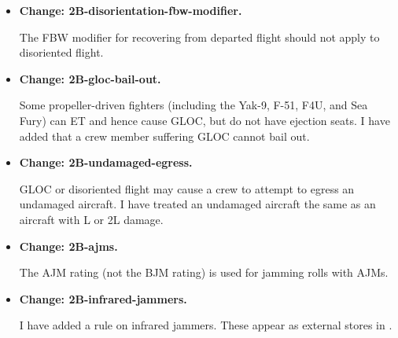\documentclass[10pt]{report}
\newcommand{\itemtag}[1]{\item \textbf{Change: #1.}\par}
\begin{document}
\begin{itemize}
    \itemtag{2B-disorientation-fbw-modifier} The FBW modifier for recovering from departed flight should not apply to disoriented flight.

    \itemtag{2B-gloc-bail-out} Some propeller-driven fighters (including the Yak-9, F-51, F4U, and Sea Fury) can ET and hence cause GLOC, but do not have ejection seats. I have added that a crew member suffering GLOC cannot bail out.

    \itemtag{2B-undamaged-egress} GLOC or disoriented flight may cause a crew to attempt to egress an undamaged aircraft. I have treated an undamaged aircraft the same as an aircraft with L or 2L damage.
    
    \itemtag{2B-ajms} The AJM rating (not the BJM rating) is used for jamming rolls with AJMs.
    
    \itemtag{2B-infrared-jammers} I have added a rule on infrared jammers. These appear as external stores in {\TSOH}.
    
    
    
    
    
    
    

\end{itemize}
\end{document}

